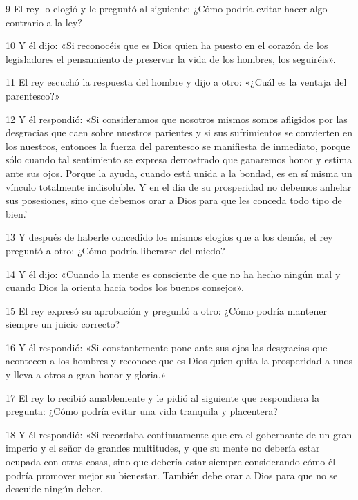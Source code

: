 \par 9 El rey lo elogió y le preguntó al siguiente: ¿Cómo podría evitar hacer algo contrario a la ley?

\par 10 Y él dijo: «Si reconocéis que es Dios quien ha puesto en el corazón de los legisladores el pensamiento de preservar la vida de los hombres, los seguiréis».

\par 11 El rey escuchó la respuesta del hombre y dijo a otro: «¿Cuál es la ventaja del parentesco?»

\par 12 Y él respondió: «Si consideramos que nosotros mismos somos afligidos por las desgracias que caen sobre nuestros parientes y si sus sufrimientos se convierten en los nuestros, entonces la fuerza del parentesco se manifiesta de inmediato, porque sólo cuando tal sentimiento se expresa demostrado que ganaremos honor y estima ante sus ojos. Porque la ayuda, cuando está unida a la bondad, es en sí misma un vínculo totalmente indisoluble. Y en el día de su prosperidad no debemos anhelar sus posesiones, sino que debemos orar a Dios para que les conceda todo tipo de bien.'

\par 13 Y después de haberle concedido los mismos elogios que a los demás, el rey preguntó a otro: ¿Cómo podría liberarse del miedo?

\par 14 Y él dijo: «Cuando la mente es consciente de que no ha hecho ningún mal y cuando Dios la orienta hacia todos los buenos consejos».

\par 15 El rey expresó su aprobación y preguntó a otro: ¿Cómo podría mantener siempre un juicio correcto?

\par 16 Y él respondió: «Si constantemente pone ante sus ojos las desgracias que acontecen a los hombres y reconoce que es Dios quien quita la prosperidad a unos y lleva a otros a gran honor y gloria.»

\par 17 El rey lo recibió amablemente y le pidió al siguiente que respondiera la pregunta: ¿Cómo podría evitar una vida tranquila y placentera?

\par 18 Y él respondió: «Si recordaba continuamente que era el gobernante de un gran imperio y el señor de grandes multitudes, y que su mente no debería estar ocupada con otras cosas, sino que debería estar siempre considerando cómo él podría promover mejor su bienestar. También debe orar a Dios para que no se descuide ningún deber.

